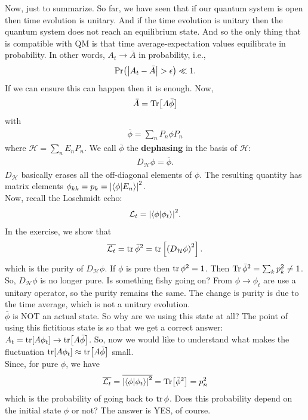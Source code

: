 \documentclass{book}
\theoremstyle{definition}
\newcommand{\lag}{\mathcal{L}}
\newcommand{\had}{\mathcal{H}}
\newcommand{\ep}{\epsilon}
\newcommand{\lp}{\left(}
\newcommand{\rp}{\right)}
\newcommand{\lb}{\left[}
\newcommand{\rb}{\right]}
\begin{document}
Now, just to summarize. So far,  we have seen that if our quantum system is open then time evolution is unitary. And if the time evolution is unitary then the quantum system does not reach an equilibrium state. And so the only thing that is compatible with QM is that time average-expectation values equilibrate in probability. In other words, $A_t \to \bar{A}$ in probability, i.e., 
\begin{align}
\Pr(\abs{A_t - \bar{A}} > \ep) \ll 1.
\end{align}
If we can ensure this can happen then it is enough. Now,
\begin{align}
\bar{A} = \Tr[A \bar{\phi}]
\end{align}
with
\begin{align}
\bar{\phi} = \sum_n P_n \phi P_n
\end{align}
where $\had = \sum_n E_n P_n$. We call $\bar{\phi}$ the \textbf{dephasing} in the basis of $\had$:
\begin{align}
D_\had \phi = \bar{\phi}.
\end{align}
$D_\had$ basically erases all the off-diagonal elements of $\phi$. The resulting quantity has matrix elements $\phi_{kk} = p_k = \abs{\braket{\phi}{E_n}}^2$. \\

Now, recall the Loschmidt echo:
\begin{align}
\lag_t = \abs{\braket{\phi}{\phi_t}}^2.
\end{align}
In the exercise, we show that 
\begin{align}
\overline{\lag_t} = \tr \bar{\phi}^2 = \tr\lb\lp D_\had \phi \rp^2 \rb.
\end{align}
which is the purity of $D_\had \phi$. If $\phi$ is pure then $\tr \phi^2 = 1$. Then $\Tr \bar{\phi}^2 = \sum_k p_k^2 \neq 1$. So, $D_\had \phi$ is no longer pure. Is something fishy going on? From $\phi \to \phi_t$ are use a unitary operator, so the purity remains the same. The change is purity is due to the time average, which is not a unitary evolution.\\

$\bar{\phi}$ is NOT an actual state.  So why are we using this state at all? The point of using this fictitious state is so that we get a correct answer: $A_t = \tr[A \phi_t] \to \tr[A\bar{\phi}]$. So, now we would like to understand what makes the fluctuation $\tr[A \phi_t] \approx \tr[A\bar{\phi}]$ small. \\

Since, for pure $\phi$, we have
\begin{align}
\overline{\lag_t} =  \overline{\abs{\braket{\phi}{\phi_t}}^2} = \Tr[\bar{\phi}^2] = p_n^2
\end{align}
which is the probability of going back to $\tr\phi$. Does this probability depend on the initial state $\phi$ or not? The answer is YES, of course. \\
\end{document}
